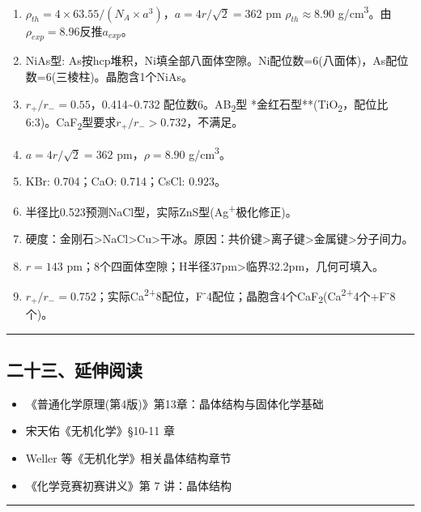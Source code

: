 \begin{enumerate}
\item
  \(\rho_{th}=4\times63.55/(N_A\times a^3)\)，\(a=4r/\sqrt{2}=362\) pm \箭 \(\rho_{th}\approx8.90\) g/cm\textsuperscript{3}。由\(\rho_{exp}=8.96\)反推\(a_{exp}\)。
\item
  NiAs型: As按hcp堆积，Ni填全部八面体空隙。Ni配位数=6(八面体)，As配位数=6(三棱柱)。晶胞含1个NiAs。
\item
  \(r_+/r_-=0.55\)，0.414\textasciitilde0.732 \箭 配位数6。AB\textsubscript{2}型 \箭 **金红石型**(TiO\textsubscript{2}，配位比6:3)。CaF\textsubscript{2}型要求\(r_+/r_->0.732\)，不满足。
\item
  \(a=4r/\sqrt{2}=362\) pm，\(\rho=8.90\) g/cm\textsuperscript{3}。
\item
  KBr: 0.704；CaO: 0.714；CsCl: 0.923。
\item
  半径比0.523预测NaCl型，实际ZnS型(Ag\textsuperscript{+}极化修正)。
\item
  硬度：金刚石\textgreater NaCl\textgreater Cu\textgreater 干冰。原因：共价键\textgreater 离子键\textgreater 金属键\textgreater 分子间力。
\item
  \(r=143\) pm；8个四面体空隙；H半径37pm\textgreater 临界32.2pm，几何可填入。
\item
  \(r_+/r_-=0.752\)；实际Ca\textsuperscript{2+}8配位，F\textsuperscript{-}4配位；晶胞含4个CaF\textsubscript{2}(Ca\textsuperscript{2+}4个+F\textsuperscript{-}8个)。
\end{enumerate}

\begin{center}\rule{0.5\linewidth}{0.5pt}\end{center}

\subsection{二十三、延伸阅读}\label{ux4e8cux5341ux4e09ux5ef6ux4f38ux9605ux8bfb}

\begin{itemize}
\tightlist
\item
  《普通化学原理(第4版)》第13章：晶体结构与固体化学基础
\item
  宋天佑《无机化学》§10-11 章
\item
  Weller 等《无机化学》相关晶体结构章节
\item
  《化学竞赛初赛讲义》第 7 讲：晶体结构
\end{itemize}

\begin{center}\rule{0.5\linewidth}{0.5pt}\end{center}
